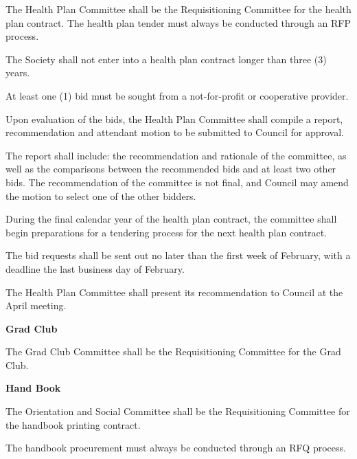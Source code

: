 \begin{longenum}[label*=\thesection.\arabic*., align=left]
\begin{longenum} [label*=\arabic*., align=left]
		\begin{longenum} [label*=\arabic*., align=left]
			\item The Health Plan Committee shall be the Requisitioning Committee for the health plan contract. The health plan tender must always be conducted through an RFP process.
		\item 	The Society shall not enter into a health plan contract longer than three (3) years.
		\item 	At least one (1) bid must be sought from a not-for-profit or cooperative provider.
		\item 	Upon evaluation of the bids, the Health Plan Committee shall compile a report, recommendation and attendant motion to be submitted to Council for approval.
		\item 	The report shall include: the recommendation and rationale of the committee, as well as the comparisons between the recommended bids and at least two other bids. The recommendation of the committee is not final, and Council may amend the motion to select one of the other bidders.
		\item During the final calendar year of the health plan contract, the committee shall begin preparations for a tendering process for the next health plan contract.
		\item 	The bid requests shall be sent out no later than the first week of February, with a deadline the last business day of February.
		\item 	The Health Plan Committee shall present its recommendation to Council at the
April meeting.
	\end{longenum}	
	
\item \textbf{Grad Club}

\begin{longenum} [label*=\arabic*., align=left]
	\item The Grad Club Committee shall be the Requisitioning Committee for the Grad Club.
\end{longenum}	

\item \textbf{Hand Book}
\begin{longenum} [label*=\arabic*., align=left]
	\item The Orientation and Social Committee shall be the Requisitioning Committee for the handbook printing contract.
	
	\item The handbook procurement must always be conducted through an RFQ process.
	

\end{longenum}
\end{longenum}
\end{longenum}
